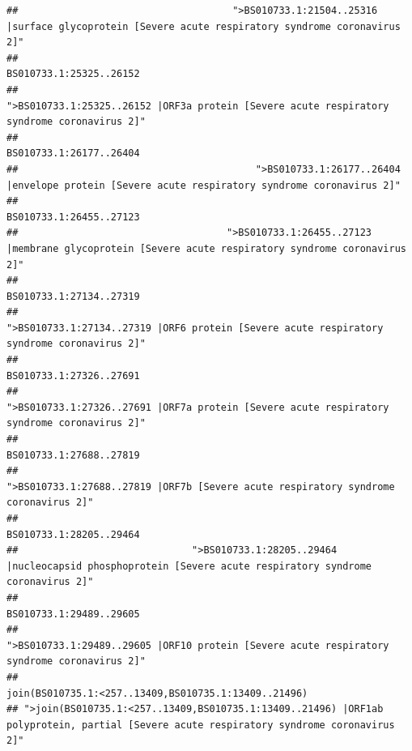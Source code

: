 \documentclass[
]{article}
\begin{document}
\begin{verbatim}
##                                     ">BS010733.1:21504..25316 |surface glycoprotein [Severe acute respiratory syndrome coronavirus 2]" 
##                                                                                                                BS010733.1:25325..26152 
##                                            ">BS010733.1:25325..26152 |ORF3a protein [Severe acute respiratory syndrome coronavirus 2]" 
##                                                                                                                BS010733.1:26177..26404 
##                                         ">BS010733.1:26177..26404 |envelope protein [Severe acute respiratory syndrome coronavirus 2]" 
##                                                                                                                BS010733.1:26455..27123 
##                                    ">BS010733.1:26455..27123 |membrane glycoprotein [Severe acute respiratory syndrome coronavirus 2]" 
##                                                                                                                BS010733.1:27134..27319 
##                                             ">BS010733.1:27134..27319 |ORF6 protein [Severe acute respiratory syndrome coronavirus 2]" 
##                                                                                                                BS010733.1:27326..27691 
##                                            ">BS010733.1:27326..27691 |ORF7a protein [Severe acute respiratory syndrome coronavirus 2]" 
##                                                                                                                BS010733.1:27688..27819 
##                                                    ">BS010733.1:27688..27819 |ORF7b [Severe acute respiratory syndrome coronavirus 2]" 
##                                                                                                                BS010733.1:28205..29464 
##                              ">BS010733.1:28205..29464 |nucleocapsid phosphoprotein [Severe acute respiratory syndrome coronavirus 2]" 
##                                                                                                                BS010733.1:29489..29605 
##                                            ">BS010733.1:29489..29605 |ORF10 protein [Severe acute respiratory syndrome coronavirus 2]" 
##                                                                                   join(BS010735.1:<257..13409,BS010735.1:13409..21496) 
## ">join(BS010735.1:<257..13409,BS010735.1:13409..21496) |ORF1ab polyprotein, partial [Severe acute respiratory syndrome coronavirus 2]" 

\end{verbatim}
\end{document}
